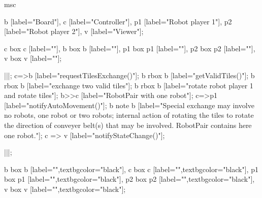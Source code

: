 \begin{msc}
msc
{

b [label="Board"],
c [label="Controller"],
p1 [label="Robot player 1"],
p2 [label="Robot player 2"],
v [label="Viewer"];

c box c [label=""],
b box b [label=""],
p1 box p1 [label=""],
p2 box p2 [label=""],
v box v [label=""];

|||;
c=>b [label="requestTilesExchange()"];
b rbox b [label="getValidTiles()"];
b rbox b [label="exchange two valid tiles"];
b rbox b [label="rotate robot player 1 and rotate tiles"];
b>>c [label="RobotPair with one robot"];
c=>p1 [label="notifyAutoMovement()"];
b note b [label="Special exchange may involve no robots, one robot or two robots; internal action of rotating the tiles to rotate the direction of conveyer belt(s) that may be involved. RobotPair contains here one robot."];
c => v [label="notifyStateChange()"];

|||;

b box b [label="",textbgcolor="black"],
c box c [label="",textbgcolor="black"],
p1 box p1 [label="",textbgcolor="black"],
p2 box p2 [label="",textbgcolor="black"],
v box v [label="",textbgcolor="black"];

}
\end{msc}

